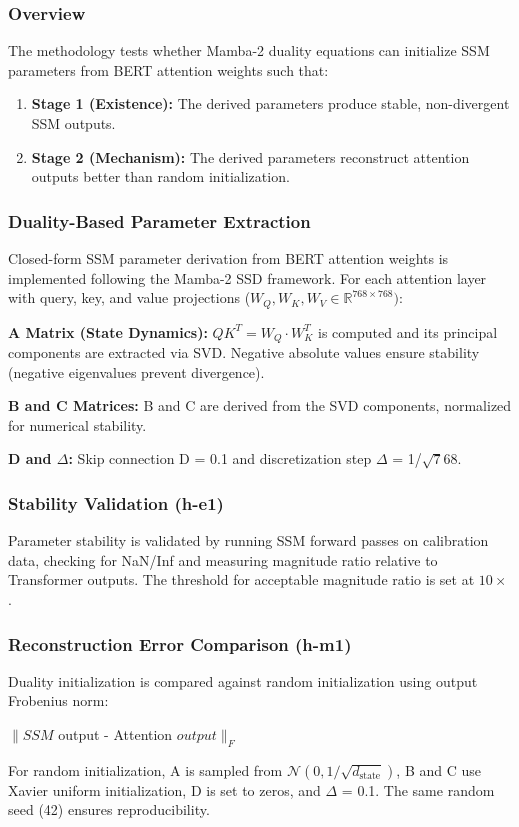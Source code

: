 
\subsubsection{Overview}

The methodology tests whether Mamba-2 duality equations can initialize SSM parameters from BERT attention weights such that:

\begin{enumerate}
\item \textbf{Stage 1 (Existence):} The derived parameters produce stable, non-divergent SSM outputs.
\item \textbf{Stage 2 (Mechanism):} The derived parameters reconstruct attention outputs better than random initialization.
\end{enumerate}

\subsubsection{Duality-Based Parameter Extraction}

Closed-form SSM parameter derivation from BERT attention weights is implemented following the Mamba-2 SSD framework. For each attention layer with query, key, and value projections ($W_Q, W_K, W_V \in \mathbb{R}^{768\times 768})$:

\textbf{A Matrix (State Dynamics):} $QK^T = W_Q \cdot W_K^T$ is computed and its principal components are extracted via SVD. Negative absolute values ensure stability (negative eigenvalues prevent divergence).

\textbf{B and C Matrices:} B and C are derived from the SVD components, normalized for numerical stability.

\textbf{D and $\Delta$:} Skip connection D = 0.1 and discretization step $\Delta$ = 1/$\sqrt768$.

\subsubsection{Stability Validation (h-e1)}

Parameter stability is validated by running SSM forward passes on calibration data, checking for NaN/Inf and measuring magnitude ratio relative to Transformer outputs. The threshold for acceptable magnitude ratio is set at $10\times$.

\subsubsection{Reconstruction Error Comparison (h-m1)}

Duality initialization is compared against random initialization using output Frobenius norm:

$\|SSM$ output - Attention $output\|_F$

For random initialization, A is sampled from $\mathcal{N}(0, 1/\sqrt{d_{\mathrm{state}}})$, B and C use Xavier uniform initialization, D is set to zeros, and $\Delta$ = 0.1. The same random seed (42) ensures reproducibility.
